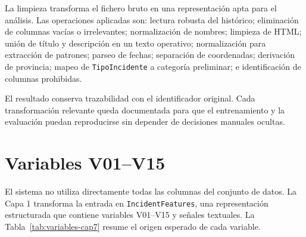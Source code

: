 La limpieza transforma el fichero bruto en una representación apta para el análisis. Las operaciones aplicadas son: lectura robusta del histórico; eliminación de columnas vacías o irrelevantes; normalización de nombres; limpieza de HTML; unión de título y descripción en un texto operativo; normalización para extracción de patrones; parseo de fechas; separación de coordenadas; derivación de provincia; mapeo de \texttt{TipoIncidente} a categoría preliminar; e identificación de columnas prohibidas.

El resultado conserva trazabilidad con el identificador original. Cada transformación relevante queda documentada para que el entrenamiento y la evaluación puedan reproducirse sin depender de decisiones manuales ocultas.

\section{Variables V01--V15}

El sistema no utiliza directamente todas las columnas del conjunto de datos. La Capa 1 transforma la entrada en \texttt{IncidentFeatures}, una representación estructurada que contiene variables V01--V15 y señales textuales. La Tabla~\ref{tab:variables-cap7} resume el origen esperado de cada variable.

